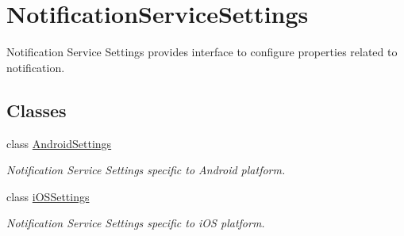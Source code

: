 \hypertarget{class_voxel_busters_1_1_native_plugins_1_1_notification_service_settings}{}\section{Notification\+Service\+Settings}
\label{class_voxel_busters_1_1_native_plugins_1_1_notification_service_settings}


Notification Service Settings provides interface to configure properties related to notification.  


\subsection*{Classes}
\begin{DoxyCompactItemize}
\item 
class \hyperlink{class_voxel_busters_1_1_native_plugins_1_1_notification_service_settings_1_1_android_settings}{Android\+Settings}
\begin{DoxyCompactList}\small\item\em Notification Service Settings specific to Android platform. \end{DoxyCompactList}\item 
class \hyperlink{class_voxel_busters_1_1_native_plugins_1_1_notification_service_settings_1_1i_o_s_settings}{i\+O\+S\+Settings}
\begin{DoxyCompactList}\small\item\em Notification Service Settings specific to i\+O\+S platform. \end{DoxyCompactList}\end{DoxyCompactItemize}
